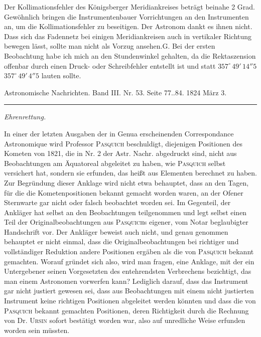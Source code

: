 \clearpage
{}
\hypertarget{native-639-lower}{}
\expandafter\def\csname HistoricalNoteText35\endcsname{Der Kollimationsfehler des Königsberger Meridiankreises beträgt beinahe 2 Grad. Gewöhnlich bringen die Instrumentenbauer Vorrichtungen an den Instrumenten an, um die Kollimationsfehler zu beseitigen. Der Astronom dankt es ihnen nicht. Dass sich das Fadennetz bei einigen Meridiankreisen auch in vertikaler Richtung bewegen lässt, sollte man nicht als Vorzug ansehen.\hfill G.}
\expandafter\def\csname HistoricalNoteText36\endcsname{Bei der ersten Beobachtung habe ich mich an den Stundenwinkel gehalten, da die Rektaszension offenbar durch einen Druck- oder Schreibfehler entstellt ist und statt $357^\circ\,49'\,14''5$ $357^\circ\,49'\,4''5$ lauten sollte.}
\begin{center}\small Astronomische Nachrichten. Band III. Nr. 53. Seite 77..84. 1824 März 3.\\[3pt]\rule{.72\linewidth}{.3pt}\end{center}
\begin{center}\emph{Ehrenrettung.}\end{center}

In einer der letzten Ausgaben der in Genua erscheinenden Correspondance Astronomique wird Professor \textsc{Pasquich} beschuldigt, diejenigen Positionen des Kometen von 1821, die in Nr. 2 der Astr. Nachr. abgedruckt sind, nicht aus Beobachtungen am Äquatoreal abgeleitet zu haben, wie \textsc{Pasquich} selbst versichert hat, sondern sie erfunden, das heißt aus Elementen berechnet zu haben. Zur Begründung dieser Anklage wird nicht etwa behauptet, dass an den Tagen, für die die Kometenpositionen bekannt gemacht worden waren, an der Ofener Sternwarte gar nicht oder falsch beobachtet worden sei. Im Gegenteil, der Ankläger hat selbst an den Beobachtungen teilgenommen und legt selbst einen Teil der Originalbeobachtungen aus \textsc{Pasquich}s eigener, vom Notar beglaubigter Handschrift vor. Der Ankläger beweist auch nicht, und genau genommen behauptet er nicht einmal, dass die Originalbeobachtungen bei richtiger und vollständiger Reduktion andere Positionen ergäben als die von \textsc{Pasquich} bekannt gemachten. Worauf gründet sich also, wird man fragen, eine Anklage, mit der ein Untergebener seinen Vorgesetzten des entehrendsten Verbrechens bezichtigt, das man einem Astronomen vorwerfen kann? Lediglich darauf, dass das Instrument gar nicht justiert gewesen sei, dass aus Beobachtungen mit einem nicht justierten Instrument keine richtigen Positionen abgeleitet werden könnten und dass die von \textsc{Pasquich} bekannt gemachten Positionen, deren Richtigkeit durch die Rechnung von Dr. \textsc{Ursin} sofort bestätigt worden war, also auf unredliche Weise erfunden worden sein müssten.

